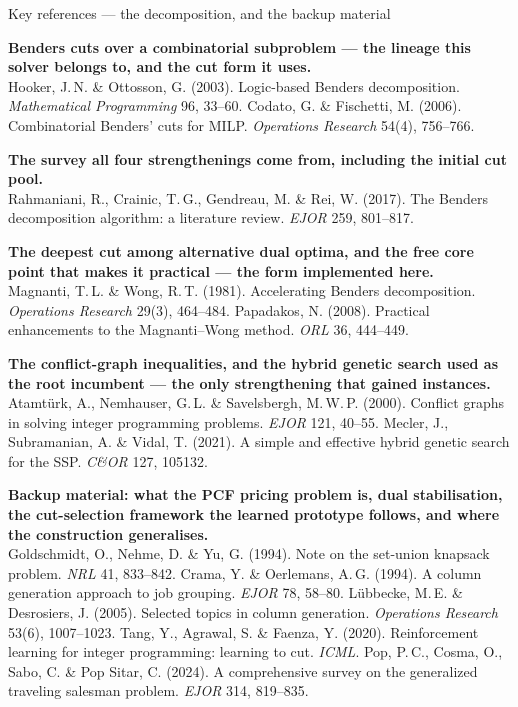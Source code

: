 \documentclass[aspectratio=169,10pt]{beamer}
\begin{document}
\begin{frame}{Key references --- the decomposition, and the backup material}
\vspace{0.2cm}
{\scriptsize
\textbf{Benders cuts over a combinatorial subproblem --- the lineage this solver belongs to,
and the cut form it uses.}\\
Hooker, J.\,N. \& Ottosson, G. (2003). Logic-based Benders decomposition.
\emph{Mathematical Programming} 96, 33--60. \quad
Codato, G. \& Fischetti, M. (2006). Combinatorial Benders' cuts for MILP.
\emph{Operations Research} 54(4), 756--766.

\vspace{0.26cm}
\textbf{The survey all four strengthenings come from, including the initial cut pool.}\\
Rahmaniani, R., Crainic, T.\,G., Gendreau, M. \& Rei, W. (2017). The Benders decomposition
algorithm: a literature review. \emph{EJOR} 259, 801--817.

\vspace{0.26cm}
\textbf{The deepest cut among alternative dual optima, and the free core point that makes it
practical --- the form implemented here.}\\
Magnanti, T.\,L. \& Wong, R.\,T. (1981). Accelerating Benders decomposition.
\emph{Operations Research} 29(3), 464--484. \quad
Papadakos, N. (2008). Practical enhancements to the Magnanti--Wong method.
\emph{ORL} 36, 444--449.

\vspace{0.26cm}
\textbf{The conflict-graph inequalities, and the hybrid genetic search used as the root
incumbent --- the only strengthening that gained instances.}\\
Atamt\"urk, A., Nemhauser, G.\,L. \& Savelsbergh, M.\,W.\,P. (2000). Conflict graphs in
solving integer programming problems. \emph{EJOR} 121, 40--55. \quad
Mecler, J., Subramanian, A. \& Vidal, T. (2021). A simple and effective hybrid genetic
search for the SSP. \emph{C\&OR} 127, 105132.

\vspace{0.26cm}
\textbf{Backup material: what the PCF pricing problem is, dual stabilisation, the
cut-selection framework the learned prototype follows, and where the construction
generalises.}\\
Goldschmidt, O., Nehme, D. \& Yu, G. (1994). Note on the set-union knapsack problem.
\emph{NRL} 41, 833--842. \quad
Crama, Y. \& Oerlemans, A.\,G. (1994). A column generation approach to job grouping.
\emph{EJOR} 78, 58--80. \quad
L\"ubbecke, M.\,E. \& Desrosiers, J. (2005). Selected topics in column generation.
\emph{Operations Research} 53(6), 1007--1023. \quad
Tang, Y., Agrawal, S. \& Faenza, Y. (2020). Reinforcement learning for integer programming:
learning to cut. \emph{ICML}. \quad
Pop, P.\,C., Cosma, O., Sabo, C. \& Pop Sitar, C. (2024). A comprehensive survey on the
generalized traveling salesman problem. \emph{EJOR} 314, 819--835.
}
\end{frame}
\end{document}
